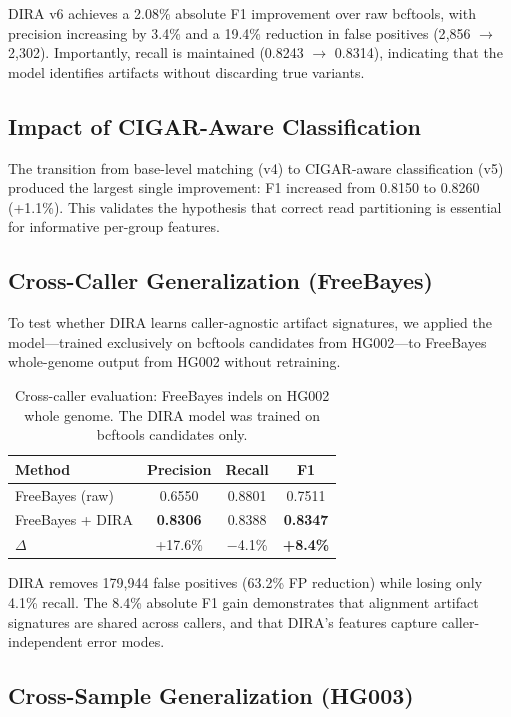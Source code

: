 \documentclass[sigconf]{acmart}
\begin{document}
DIRA v6 achieves a 2.08\% absolute F1 improvement over raw bcftools, with precision increasing by 3.4\% and a 19.4\% reduction in false positives (2{,}856 $\to$ 2{,}302). Importantly, recall is maintained (0.8243 $\to$ 0.8314), indicating that the model identifies artifacts without discarding true variants.

\subsection{Impact of CIGAR-Aware Classification}
The transition from base-level matching (v4) to CIGAR-aware classification (v5) produced the largest single improvement: F1 increased from 0.8150 to 0.8260 (+1.1\%). This validates the hypothesis that correct read partitioning is essential for informative per-group features.

\subsection{Cross-Caller Generalization (FreeBayes)}
To test whether DIRA learns caller-agnostic artifact signatures, we applied the model---trained exclusively on bcftools candidates from HG002---to FreeBayes whole-genome output from HG002 without retraining.

\begin{table}[h]
\caption{Cross-caller evaluation: FreeBayes indels on HG002 whole genome. The DIRA model was trained on bcftools candidates only.}
\label{tab:freebayes}
\begin{tabular}{lccc}
\toprule
\textbf{Method} & \textbf{Precision} & \textbf{Recall} & \textbf{F1} \\
\midrule
FreeBayes (raw) & 0.6550 & 0.8801 & 0.7511 \\
FreeBayes + DIRA & \textbf{0.8306} & 0.8388 & \textbf{0.8347} \\
\midrule
$\Delta$ & +17.6\% & $-$4.1\% & \textbf{+8.4\%} \\
\bottomrule
\end{tabular}
\end{table}

DIRA removes 179{,}944 false positives (63.2\% FP reduction) while losing only 4.1\% recall. The 8.4\% absolute F1 gain demonstrates that alignment artifact signatures are shared across callers, and that DIRA's features capture caller-independent error modes.

\subsection{Cross-Sample Generalization (HG003)}
\end{document}
